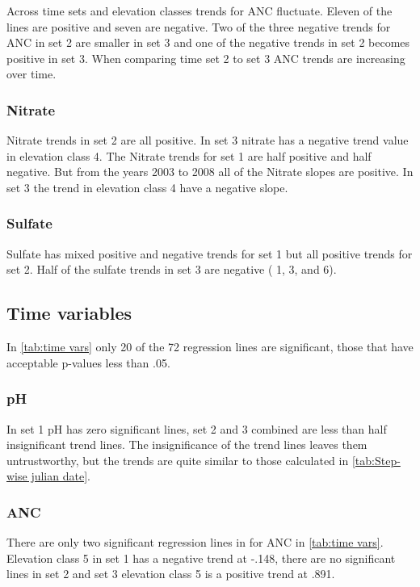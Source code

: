 Across time sets and elevation classes trends for ANC fluctuate.  Eleven of the lines are positive and seven are negative.   Two of the three negative trends for ANC in set 2 are smaller in set 3 and one of the negative trends in set 2 becomes positive in set 3.  When comparing time set 2 to set 3 ANC trends are increasing over time. 

\subsubsection{Nitrate}%

Nitrate trends in set 2 are all positive.  In set 3 nitrate has a negative trend value in elevation class 4.  The Nitrate trends for set 1 are half positive and half negative.  But from the years 2003 to 2008 all of the Nitrate slopes are positive.  In set 3 the trend in elevation class 4  have a negative slope. 

\subsubsection{Sulfate}%

 Sulfate has mixed positive and negative trends for set 1 but all positive trends for set 2.   Half of the sulfate trends in set 3 are negative ( 1, 3, and 6).

\subsection{Time variables}

In \autoref{tab:time vars} only 20 of the 72 regression lines are significant, those that have acceptable p-values less than .05. 

\subsubsection{pH}

In set 1 pH has zero significant lines, set 2 and 3 combined are less than half insignificant trend lines.  The insignificance of the trend lines leaves them untrustworthy, but the trends are quite similar to those calculated in \autoref{tab:Step-wise julian date}.

\subsubsection{ANC}

There are only two significant regression lines in for ANC in \autoref{tab:time vars}.  Elevation class 5 in set 1 has a negative trend at -.148, there are no significant lines in set 2 and set 3 elevation class 5 is a positive trend at .891.  


